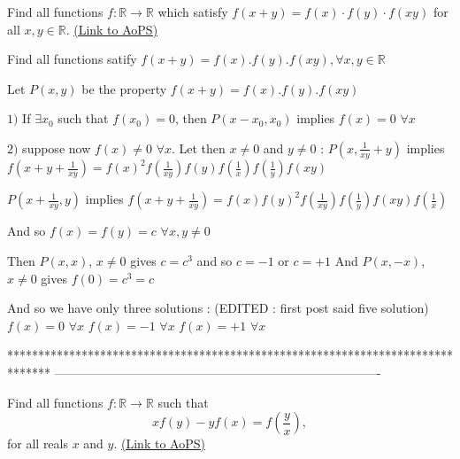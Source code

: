 \begin{problem}
	Find all functions $f: \mathbb R \to \mathbb R$ which satisfy $ f(x+y)=f(x)\cdot f(y) \cdot f(xy)$ for all $x,y\in\mathbb{R}$.
	\flushright \href{https://artofproblemsolving.com/community/c6h182651}{(Link to AoPS)}
\end{problem}



\begin{solution}
	\begin{tcolorbox}Find all functions satify $ f(x + y) = f(x).f(y).f(xy), \forall x,y\in\mathbb{R}$\end{tcolorbox}

Let $ P(x,y)$ be the property $ f(x + y) = f(x).f(y).f(xy)$

$ 1)$ If $ \exists x_0$ such that $ f(x_0) = 0$, then $ P(x - x_0,x_0)$ implies $ f(x) = 0$ $ \forall x$

$ 2)$ suppose now $ f(x)\neq 0$ $ \forall x$. Let then $ x\neq 0$ and $ y\neq 0$ :
$ P(x,\frac {1}{xy} + y)$ implies $ f(x + y + \frac {1}{xy}) = f(x)^2f(\frac {1}{xy})f(y)f(\frac {1}{x})f(\frac {1}{y})f(xy)$

$ P(x + \frac {1}{xy},y)$ implies $ f(x + y + \frac {1}{xy}) = f(x)f(y)^2f(\frac {1}{xy})f(\frac {1}{y})f(xy)f(\frac {1}{x})$

And so $ f(x) = f(y)=c$ $ \forall x,y\neq 0$

Then $ P(x,x)$, $ x\neq 0$  gives $ c=c^3$ and so $ c=-1$ or $ c=+1$
And $ P(x,-x)$, $ x\neq 0$ gives $ f(0)=c^3=c$

And so we have only three solutions : (EDITED : first post said five solution)
$ f(x) = 0$ $ \forall x$
$ f(x) = - 1$ $ \forall x$
$ f(x) = + 1$ $ \forall x$
\end{solution}
*******************************************************************************
-------------------------------------------------------------------------------

\begin{problem}
	Find all functions $f: \mathbb R \to \mathbb R$ such that $$ xf(y)-yf(x)=f\left( {\frac{y}{x}} \right),$$ for all reals $x$ and $y$.
	\flushright \href{https://artofproblemsolving.com/community/c6h183261}{(Link to AoPS)}
\end{problem}




